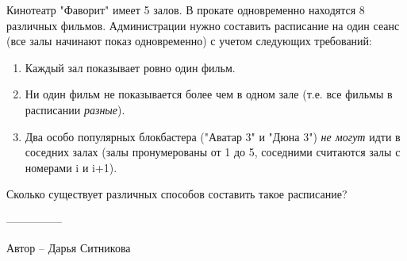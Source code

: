 \question
Кинотеатр "Фаворит" имеет 5 залов. В прокате одновременно находятся 8 различных фильмов. Администрации нужно составить расписание на один сеанс (все залы начинают показ одновременно) с учетом следующих требований:

\begin{enumerate}
    \item Каждый зал показывает ровно один фильм.
    \item Ни один фильм не показывается более чем в одном зале (т.е. все фильмы в расписании \textit{разные}).
    \item Два особо популярных блокбастера ("Аватар 3" и "Дюна 3") \textit{не могут} идти в соседних залах (залы пронумерованы от 1 до 5, соседними считаются залы с номерами i и i+1).
\end{enumerate}
Сколько существует различных способов составить такое расписание?

---------------

Автор -- Дарья Ситникова

